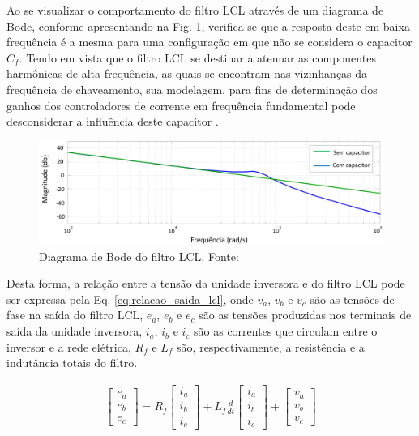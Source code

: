Ao se visualizar o comportamento do filtro LCL através de um diagrama de Bode, conforme apresentando na Fig. \ref{fig:Diagrama_Bode_LCL}, verifica-se que a resposta deste em baixa frequência é a mesma para uma configuração em que não se considera o capacitor $C_f$. Tendo em vista que o filtro LCL se destinar a atenuar as componentes harmônicas de alta frequência, as quais se encontram nas vizinhanças da frequência de chaveamento, sua modelagem, para fins de determinação dos ganhos dos controladores de corrente em frequência fundamental pode desconsiderar a influência deste capacitor \cite{TeseProfAlex}.

\begin{figure}[!hbt]
	\begin{center}
		\includegraphics[width=\columnwidth]{figuras/Diagrama_Bode_Filtro_LCL.png}
		\caption{Diagrama de Bode do filtro LCL. Fonte: \cite{TeseProfAlex}}
		\label{fig:Diagrama_Bode_LCL}
	\end{center}
\end{figure}

Desta forma, a relação entre a tensão da unidade inversora e do filtro LCL pode ser expressa pela Eq. \ref{eq:relacao_saida_lcl}, onde $v_a$, $v_b$ e $v_c$ são as tensões de fase na saída do filtro LCL, $e_a$, $e_b$ e $e_c$ são as tensões produzidas nos terminais de saída da unidade inversora, $i_a$, $i_b$ e $i_c$ são as correntes que circulam entre o inversor e a rede elétrica, $R_f$ e $L_f$ são, respectivamente, a resistência e a indutância totais do filtro.

\begin{align}\label{eq:relacao_saida_lcl}
	\begin{bmatrix}
		e_a \\ e_b \\ e_c
	\end{bmatrix}
	= R_f
	\begin{bmatrix}
		i_a \\ i_b \\ i_c
	\end{bmatrix}
	+ L_f\frac{d}{dt}
	\begin{bmatrix}
		i_a \\ i_b \\ i_c
	\end{bmatrix}
	+
	\begin{bmatrix}
		v_a \\ v_b \\ v_c
	\end{bmatrix}
\end{align}

